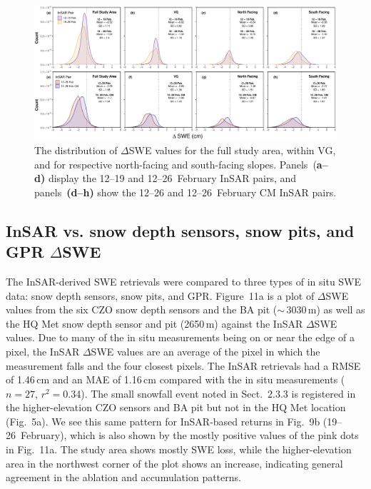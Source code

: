 \begin{figure}[t]
\includegraphics[width=\textwidth]{figures/ch3_figs/fig10.pdf}
\caption{The distribution of $\Delta$SWE values for the full study area, within VG, and for respective north-facing and south-facing slopes. Panels~(\textbf{a--d)} display the 12--19 and 12--26~February InSAR pairs, and panels~\textbf{(d--h)} show the 12--26 and 12--26~February CM InSAR pairs.}
\end{figure}

\hypertarget{ch3-results-2}{\subsection{InSAR vs. snow depth sensors, snow pits, and GPR $\Delta$SWE}\label{ch3-results-2}}


The InSAR-derived SWE retrievals were compared to three types of in situ SWE data: snow depth sensors, snow pits, and GPR. Figure~11a is a plot of $\Delta$SWE values from the six CZO snow depth sensors and the BA pit ($\sim$\,3030\,m) as well as the HQ Met snow depth sensor and pit (2650\,m) against the InSAR $\Delta$SWE values. Due to many of the in situ measurements being on or near the edge of a pixel, the InSAR $\Delta$SWE values are an average of the pixel in which the measurement falls and the four closest pixels. The InSAR retrievals had a RMSE of 1.46\,cm and an MAE of 1.16\,cm compared with the in situ measurements ($n = 27$, $r^{2} = 0$.34). The small snowfall event noted in Sect.~2.3.3 is registered in the higher-elevation CZO sensors and BA pit but not in the HQ Met location (Fig.~5a). We see this same pattern for InSAR-based returns in Fig.~9b (19--26~February), which is also shown by the mostly positive values of the pink dots in Fig.~11a. The study area shows mostly SWE loss, while the higher-elevation area in the northwest corner of the plot shows an increase, indicating general agreement in the ablation and accumulation patterns.

